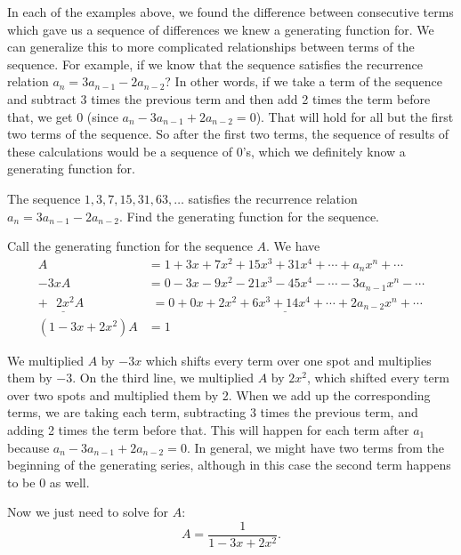 \documentclass[12pt]{article}
\begin{document}
In each of the examples above, we found the difference between consecutive terms which gave us a sequence of differences we knew a generating function for.  We can generalize this to more complicated relationships between terms of the sequence.  For example, if we know that the sequence satisfies the recurrence relation $a_n = 3a_{n-1} - 2a_{n-2}$?  In other words, if we take a term of the sequence and subtract 3 times the previous term and then add 2 times the term before that, we get 0 (since $a_n - 3a_{n-1} + 2a_{n-2} = 0$).  That will hold for all but the first two terms of the sequence.  So after the first two terms, the sequence of results of these calculations would be a sequence of 0's, which we definitely know a generating function for.

\begin{example}
 The sequence $1, 3, 7, 15, 31, 63, \ldots$ satisfies the recurrence relation $a_n = 3a_{n-1} - 2a_{n-2}$.  Find the generating function for the sequence.

 \begin{solution}
  Call the generating function for the sequence $A$.  We have
  \begin{align*}
   A & = 1 + 3x + 7x^2 + 15x^3 + 31x^4 + \cdots + a_nx^n + \cdots \\
   -3xA & = 0 - 3x - 9x^2 - 21x^3 - 45x^4 - \cdots - 3a_{n-1}x^n - \cdots \\
   \underline{+~~~2x^2A_{~}^{~^{~}}} & \underline{\,\, = 0 + 0x + 2x^2 + 6x^3 + 14x^4 + \cdots + 2a_{n-2}x^n + \cdots} \\
   (1-3x+2x^2)A & = 1
  \end{align*}


  We multiplied $A$ by $-3x$ which shifts every term over one spot and multiplies them by $-3$.  On the third line, we multiplied $A$ by $2x^2$, which shifted every term over two spots and multiplied them by 2.  When we add up the corresponding terms, we are taking each term, subtracting 3 times the previous term, and adding 2 times the term before that.  This will happen for each term after $a_1$ because $a_n - 3a_{n-1} + 2a_{n-2} = 0$.  In general, we might have two terms from the beginning of the generating series, although in this case the second term happens to be 0 as well.

  Now we just need to solve for $A$:
  \[A = \frac{1}{1 - 3x + 2x^2}.\]
 \end{solution}

\end{example}
\end{document}
